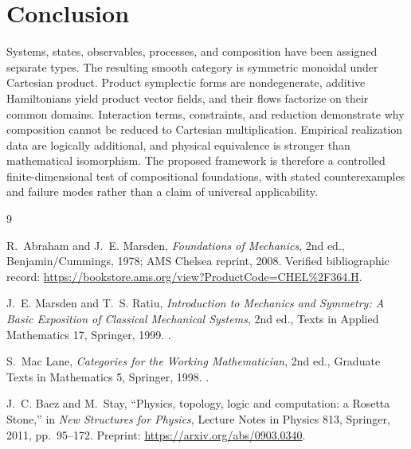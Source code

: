 \documentclass[11pt]{article}
\begin{document}
\section{Conclusion}

Systems, states, observables, processes, and composition have been assigned separate types. The resulting smooth category is symmetric monoidal under Cartesian product. Product symplectic forms are nondegenerate, additive Hamiltonians yield product vector fields, and their flows factorize on their common domains. Interaction terms, constraints, and reduction demonstrate why composition cannot be reduced to Cartesian multiplication. Empirical realization data are logically additional, and physical equivalence is stronger than mathematical isomorphism. The proposed framework is therefore a controlled finite-dimensional test of compositional foundations, with stated counterexamples and failure modes rather than a claim of universal applicability.

\begin{thebibliography}{9}

R.~Abraham and J.~E. Marsden,
\emph{Foundations of Mechanics}, 2nd ed.,
Benjamin/Cummings, 1978; AMS Chelsea reprint, 2008.
Verified bibliographic record: \url{https://bookstore.ams.org/view?ProductCode=CHEL%2F364.H}.

J.~E. Marsden and T.~S. Ratiu,
\emph{Introduction to Mechanics and Symmetry: A Basic Exposition of Classical Mechanical Systems}, 2nd ed.,
Texts in Applied Mathematics 17, Springer, 1999.
.

S.~Mac Lane,
\emph{Categories for the Working Mathematician}, 2nd ed.,
Graduate Texts in Mathematics 5, Springer, 1998.
.

J.~C. Baez and M.~Stay,
``Physics, topology, logic and computation: a Rosetta Stone,''
in \emph{New Structures for Physics}, Lecture Notes in Physics 813,
Springer, 2011, pp.~95--172.
Preprint: \url{https://arxiv.org/abs/0903.0340}.

\end{thebibliography}
\end{document}
